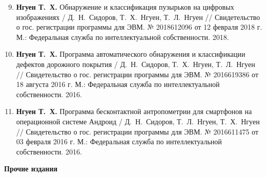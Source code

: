 \begin{enumerate}[label=\arabic*.]\setcounter{enumi}{8}
\item \textbf{Нгуен Т.~Х.} Обнаружение и классификация пузырьков на цифровых изображениях / Д.~Н.~Сидоров, Т.~Х.~Нгуен, Т.~Л.~Нгуен // Свидетельство о гос. регистрации программы для ЭВМ. № 2018612096 от 12 февраля 2018 г. М.: Федеральная служба по интеллектуальной собственности. 2018.

\item\textbf{Нгуен Т.~Х.} Программа автоматического обнаружения и классификации дефектов дорожного покрытия / Д.~Н.~Сидоров, Т.~Х.~Нгуен, Т.~Л.~Нгуен // Свидетельство о гос. регистрации программы для ЭВМ. № 2016619386 от 18 августа 2016 г. М.: Федеральная служба по интеллектуальной собственности. 2016.

\item\textbf{Нгуен Т.~Х.} Программа бесконтактной антропометрии для смартфонов на операционной системе Андроид / Д.~Н.~Сидоров, Т.~Л.~Нгуен, Т.~Х.~Нгуен // Свидетельство о гос. регистрации программы для ЭВМ. № 2016611475 от 03 февраля 2016 г. М.: Федеральная служба по интеллектуальной собственности. 2016.
\end{enumerate}

\noindent\textbf{Прочие издания}

